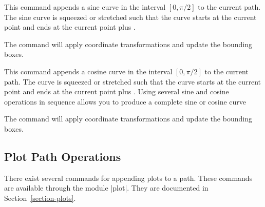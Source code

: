 \begin{command}{\pgfpathsine{}}
    This command appends a sine curve in the interval $[0,\pi/2]$ to the
    current path. The sine curve is squeezed or stretched such that the curve
    starts at the current point and ends at the current point plus
    .
\begin{codeexample}[]
\end{codeexample}
    The command will apply coordinate transformations and update the bounding
    boxes.
\end{command}

\begin{command}{\pgfpathcosine{}}
    This command appends a cosine curve in the interval $[0,\pi/2]$ to the
    current path. The curve is squeezed or stretched such that the curve starts
    at the current point and ends at the current point plus .
    Using several sine and cosine operations in sequence allows you to produce
    a complete sine or cosine curve
\begin{codeexample}[]
\begin{pgfpicture}
  \pgfpathmoveto{\pgfpoint{0cm}{0cm}}
  \pgfpathsine{\pgfpoint{1cm}{1cm}}
  \pgfpathcosine{\pgfpoint{1cm}{-1cm}}
  \pgfpathsine{\pgfpoint{1cm}{-1cm}}
  \pgfpathcosine{\pgfpoint{1cm}{1cm}}
\end{pgfpicture}
\end{codeexample}
    The command will apply coordinate transformations and update the bounding
    boxes.
\end{command}


\subsection{Plot Path Operations}

There exist several commands for appending plots to a path. These commands are
available through the module |plot|. They are documented in
Section~\ref{section-plots}.


